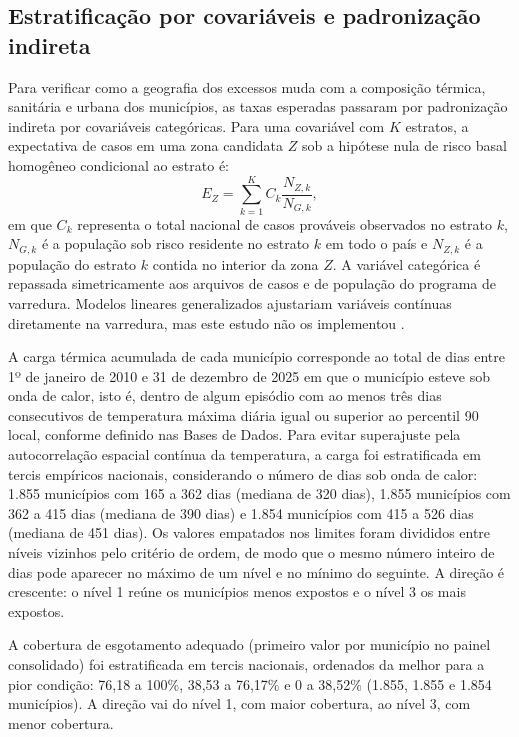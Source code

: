 \subsection{Estratificação por covariáveis e padronização indireta}
\label{subsec:estratificacao_termica}

Para verificar como a geografia dos excessos muda com a composição térmica, sanitária e urbana dos municípios, as taxas esperadas passaram por padronização indireta por covariáveis categóricas. Para uma covariável com $K$ estratos, a expectativa de casos em uma zona candidata $Z$ sob a hipótese nula de risco basal homogêneo condicional ao estrato é:
\begin{equation}
E_Z = \sum_{k=1}^{K} C_k \frac{N_{Z,k}}{N_{G,k}},
\label{eq:expected_covariate_thermal}
\end{equation}
em que $C_k$ representa o total nacional de casos prováveis observados no estrato $k$, $N_{G,k}$ é a população sob risco residente no estrato $k$ em todo o país e $N_{Z,k}$ é a população do estrato $k$ contida no interior da zona $Z$. A variável categórica é repassada simetricamente aos arquivos de casos e de população do programa de varredura. Modelos lineares generalizados ajustariam variáveis contínuas diretamente na varredura, mas este estudo não os implementou \cite{jung2009glm}.

A carga térmica acumulada de cada município corresponde ao total de dias entre 1º de janeiro de 2010 e 31 de dezembro de 2025 em que o município esteve sob onda de calor, isto é, dentro de algum episódio com ao menos três dias consecutivos de temperatura máxima diária igual ou superior ao percentil 90 local, conforme definido nas Bases de Dados. Para evitar superajuste pela autocorrelação espacial contínua da temperatura, a carga foi estratificada em tercis empíricos nacionais, considerando o número de dias sob onda de calor: 1.855 municípios com 165 a 362 dias (mediana de 320 dias), 1.855 municípios com 362 a 415 dias (mediana de 390 dias) e 1.854 municípios com 415 a 526 dias (mediana de 451 dias). Os valores empatados nos limites foram divididos entre níveis vizinhos pelo critério de ordem, de modo que o mesmo número inteiro de dias pode aparecer no máximo de um nível e no mínimo do seguinte. A direção é crescente: o nível 1 reúne os municípios menos expostos e o nível 3 os mais expostos.

A cobertura de esgotamento adequado (primeiro valor por município no painel consolidado) foi estratificada em tercis nacionais, ordenados da melhor para a pior condição: 76,18 a 100\%, 38,53 a 76,17\% e 0 a 38,52\% (1.855, 1.855 e 1.854 municípios). A direção vai do nível 1, com maior cobertura, ao nível 3, com menor cobertura.

